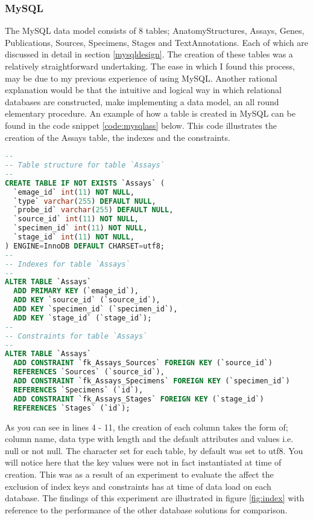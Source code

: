\subsubsection*{MySQL}
The MySQL data model consists of 8 tables; AnatomyStructures, Assays, Genes, Publications, Sources, Specimens, Stages and TextAnnotations. Each of which are discussed in detail in section \ref{mysqldesign}. The creation of these tables was a relatively straightforward undertaking. The ease in which I found this process, may be due to my previous experience of using MySQL. Another rational explanation would be that the intuitive and logical way in which relational databases are constructed, make implementing a data model, an all round elementary procedure. An example of how a table is created in MySQL can be found in the code snippet \ref{code:mysqlass} below. This code illustrates the creation of the Assays table, the indexes and the constraints.
\newpage
\vspace*{\fill}
\begin{lstlisting}[language=SQL, caption=Creation of Assays table in MySQL., label=code:mysqlass]
--
-- Table structure for table `Assays`
--
CREATE TABLE IF NOT EXISTS `Assays` (
  `emage_id` int(11) NOT NULL,
  `type` varchar(255) DEFAULT NULL,
  `probe_id` varchar(255) DEFAULT NULL,
  `source_id` int(11) NOT NULL,
  `specimen_id` int(11) NOT NULL,
  `stage_id` int(11) NOT NULL,
) ENGINE=InnoDB DEFAULT CHARSET=utf8;
--
-- Indexes for table `Assays`
--
ALTER TABLE `Assays`
  ADD PRIMARY KEY (`emage_id`),
  ADD KEY `source_id` (`source_id`),
  ADD KEY `specimen_id` (`specimen_id`),
  ADD KEY `stage_id` (`stage_id`);
--
-- Constraints for table `Assays`
--
ALTER TABLE `Assays`
  ADD CONSTRAINT `fk_Assays_Sources` FOREIGN KEY (`source_id`)
  REFERENCES `Sources` (`source_id`),
  ADD CONSTRAINT `fk_Assays_Specimens` FOREIGN KEY (`specimen_id`)
  REFERENCES `Specimens` (`id`),
  ADD CONSTRAINT `fk_Assays_Stages` FOREIGN KEY (`stage_id`)
  REFERENCES `Stages` (`id`);
\end{lstlisting}
\vspace*{\fill}
\newpage

As you can see in lines 4 - 11, the creation of each column takes the form of; column name, data type with length and the default attributes and values i.e. null or not null. The character set for each table, by default was set to utf8. You will notice here that the key values were not in fact instantiated at time of creation. This was as a result of an experiment to evaluate the affect the exclusion of index keys and constraints has at time of data load on each database. The findings of this experiment are illustrated in figure \ref{fig:index} with reference to the performance of the other database solutions for comparison.

